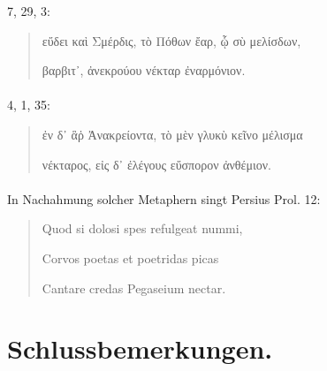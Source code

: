 \documentclass[a4paper, 11pt, oneside]{article}
\begin{document}
7, 29, 3:
\begin{quotation}\large
εὔδει καὶ Σμέρδις, τὸ Πόθων ἔαρ, ᾧ σὺ μελίσδων,

βαρβιτ᾽, ἀνεκρούου νέκταρ ἐναρμόνιον.
\end{quotation}
\paragraph{}
4, 1, 35:
\begin{quotation}\large
ἐν δ᾽ ἃῥ Ἀνακρείοντα, τὸ μὲν γλυκὺ κεῖνο μέλισμα

νέκταρος, εἰς δ᾽ ἐλέγους εὔσπορον ἀνθέμιον.
\end{quotation}
\paragraph{}
In Nachahmung solcher Metaphern singt Persius Prol. 12:
\begin{quotation}\large
Quod si dolosi spes refulgeat nummi,

Corvos poetas et poetridas picas

Cantare credas Pegaseium nectar.
\end{quotation}
\paragraph{}
\clearpage
\section{Schlussbemerkungen.}
\end{document}
